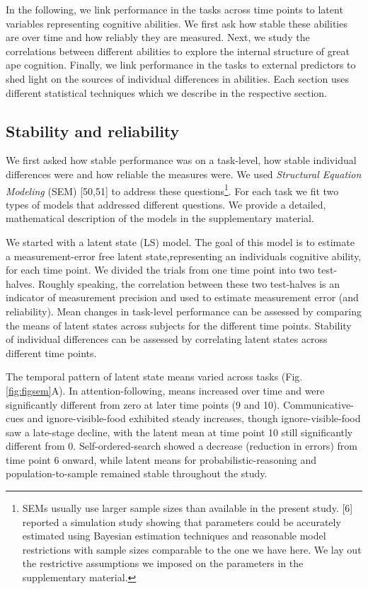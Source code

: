 \documentclass[
  man,floatsintext]{apa6}
\begin{document}
In the following, we link performance in the tasks across time points to latent variables representing cognitive abilities. We first ask how stable these abilities are over time and how reliably they are measured. Next, we study the correlations between different abilities to explore the internal structure of great ape cognition. Finally, we link performance in the tasks to external predictors to shed light on the sources of individual differences in abilities. Each section uses different statistical techniques which we describe in the respective section.

\subsection{Stability and reliability}\label{stability-and-reliability}

We first asked how stable performance was on a task-level, how stable individual differences were and how reliable the measures were. We used \emph{Structural Equation Modeling} (SEM) {[}50,51{]} to address these questions\footnote{SEMs usually use larger sample sizes than available in the present study. {[}6{]} reported a simulation study showing that parameters could be accurately estimated using Bayesian estimation techniques and reasonable model restrictions with sample sizes comparable to the one we have here. We lay out the restrictive assumptions we imposed on the parameters in the supplementary material.}. For each task we fit two types of models that addressed different questions. We provide a detailed, mathematical description of the models in the supplementary material.

We started with a latent state (LS) model. The goal of this model is to estimate a measurement-error free latent state,representing an individuals cognitive ability, for each time point. We divided the trials from one time point into two test-halves. Roughly speaking, the correlation between these two test-halves is an indicator of measurement precision and used to estimate measurement error (and reliability). Mean changes in task-level performance can be assessed by comparing the means of latent states across subjects for the different time points. Stability of individual differences can be assessed by correlating latent states across different time points.

The temporal pattern of latent state means varied across tasks (Fig. \ref{fig:figsem}A). In attention-following, means increased over time and were significantly different from zero at later time points (9 and 10). Communicative-cues and ignore-visible-food exhibited steady increases, though ignore-visible-food saw a late-stage decline, with the latent mean at time point 10 still significantly different from 0. Self-ordered-search showed a decrease (reduction in errors) from time point 6 onward, while latent means for probabilistic-reasoning and population-to-sample remained stable throughout the study.
\end{document}
